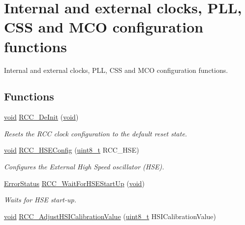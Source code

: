 \hypertarget{group___r_c_c___group1}{\section{Internal and external clocks, P\-L\-L, C\-S\-S and M\-C\-O configuration functions}
\label{group___r_c_c___group1}
}


Internal and external clocks, P\-L\-L, C\-S\-S and M\-C\-O configuration functions.  


\subsection*{Functions}
\begin{DoxyCompactItemize}
\item 
\hyperlink{group___n_a_m_e_ga18028b8badbf1ea7e704ccac3c488e82}{void} \hyperlink{group___r_c_c___group1_ga413f6422be11b1334abe60b3bff2e062}{R\-C\-C\-\_\-\-De\-Init} (\hyperlink{group___n_a_m_e_ga18028b8badbf1ea7e704ccac3c488e82}{void})
\begin{DoxyCompactList}\small\item\em Resets the R\-C\-C clock configuration to the default reset state. \end{DoxyCompactList}\item 
\hyperlink{group___n_a_m_e_ga18028b8badbf1ea7e704ccac3c488e82}{void} \hyperlink{group___r_c_c___group1_ga523b06e73f6aa8a03e42299c855066a8}{R\-C\-C\-\_\-\-H\-S\-E\-Config} (\hyperlink{stdint_8h_aba7bc1797add20fe3efdf37ced1182c5}{uint8\-\_\-t} R\-C\-C\-\_\-\-H\-S\-E)
\begin{DoxyCompactList}\small\item\em Configures the External High Speed oscillator (H\-S\-E). \end{DoxyCompactList}\item 
\hyperlink{group___exported__types_ga8333b96c67f83cba354b3407fcbb6ee8}{Error\-Status} \hyperlink{group___r_c_c___group1_gae0f15692614dd048ee4110a056f001dc}{R\-C\-C\-\_\-\-Wait\-For\-H\-S\-E\-Start\-Up} (\hyperlink{group___n_a_m_e_ga18028b8badbf1ea7e704ccac3c488e82}{void})
\begin{DoxyCompactList}\small\item\em Waits for H\-S\-E start-\/up. \end{DoxyCompactList}\item 
\hyperlink{group___n_a_m_e_ga18028b8badbf1ea7e704ccac3c488e82}{void} \hyperlink{group___r_c_c___group1_gaa2d6a35f5c2e0f86317c3beb222677fc}{R\-C\-C\-\_\-\-Adjust\-H\-S\-I\-Calibration\-Value} (\hyperlink{stdint_8h_aba7bc1797add20fe3efdf37ced1182c5}{uint8\-\_\-t} H\-S\-I\-Calibration\-Value)

\end{DoxyCompactItemize}
